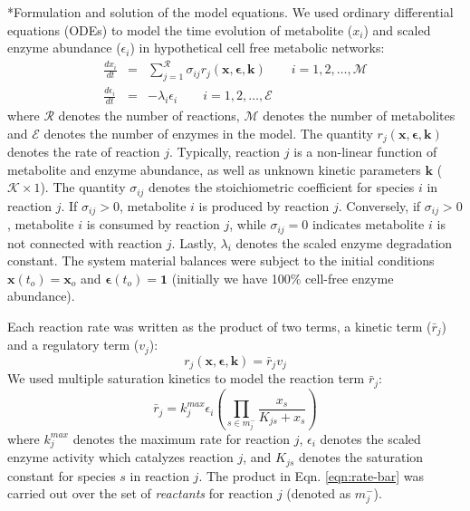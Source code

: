 \documentclass[12pt]{article}
\makeatletter
\renewcommand\subsection{\@startsection
	{subsection}{2}{0mm}
	{-0.05in}
	{-0.5\baselineskip}
	{\normalfont\normalsize\bfseries}}
\makeatother
\begin{document}
\subsection*{Formulation and solution of the model equations.}
We used ordinary differential equations (ODEs) to model the time evolution of metabolite ($x_{i}$) and scaled enzyme abundance ($\epsilon_{i}$) in hypothetical cell free
metabolic networks:
\begin{eqnarray}
	\frac{dx_{i}}{dt} & = & \sum_{j = 1}^{\mathcal{R}}\sigma_{ij}r_{j}\left(\mathbf{x},\mathbf{\epsilon},\mathbf{k}\right)\qquad{i=1,2,\hdots,\mathcal{M}}\\
	\frac{d\epsilon_{i}}{dt} & = & -\lambda_{i}\epsilon_{i}\qquad{i = 1,2,\hdots,\mathcal{E}}
\end{eqnarray}where $\mathcal{R}$ denotes the number of reactions, $\mathcal{M}$ denotes the number of metabolites and $\mathcal{E}$ denotes the number of
enzymes in the model. The quantity $r_{j}\left(\mathbf{x},\mathbf{\epsilon},\mathbf{k}\right)$ 
denotes the rate of reaction $j$. Typically, reaction $j$ is a non-linear function of metabolite and enzyme abundance, as well as unknown kinetic parameters 
$\mathbf{k}$ ($\mathcal{K}\times{1}$).
The quantity $\sigma_{ij}$ denotes the stoichiometric coefficient for species $i$ in reaction $j$. If 
$\sigma_{ij}>0$, metabolite $i$ is produced by reaction $j$. Conversely, if $\sigma_{ij}>0$, metabolite $i$ is consumed by reaction $j$, while $\sigma_{ij} = 0$ indicates
metabolite $i$ is not connected with reaction $j$. Lastly, $\lambda_{i}$ denotes the scaled enzyme degradation constant. The system material balances were subject to the
initial conditions $\mathbf{x}\left(t_{o}\right) = \mathbf{x}_{o}$ and $\mathbf{\epsilon}\left(t_{o}\right) = \mathbf{1}$ (initially we have 100\% cell-free enzyme abundance).

Each reaction rate was written as the product of two terms, a kinetic term ($\bar{r}_{j}$) and a regulatory term ($v_{j}$):
\begin{equation}\label{eqn:rate-factor}
	r_{j}\left(\mathbf{x},\mathbf{\epsilon},\mathbf{k}\right) = \bar{r}_{j}v_{j}
\end{equation}We used multiple saturation kinetics to model the reaction term $\bar{r}_{j}$:
\begin{equation}\label{eqn:rate-bar}
	\bar{r}_{j} = k_{j}^{max}\epsilon_{i}\left(\prod_{s\in{m_{j}^{-}}}\frac{x_{s}}{K_{js} + x_{s}}\right)
\end{equation}where $k_{j}^{max}$ denotes the maximum rate for reaction $j$, $\epsilon_{i}$ denotes the scaled enzyme activity which catalyzes reaction $j$, and
$K_{js}$ denotes the saturation constant for species $s$ in reaction $j$. 
The product in Eqn. \eqref{eqn:rate-bar} was carried out over the set of \textit{reactants} for reaction $j$ (denoted as $m_{j}^{-}$). 
\end{document}
